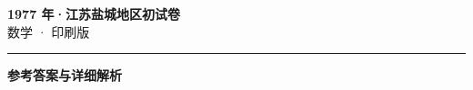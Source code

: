\documentclass[zihao=5, a4paper]{ctexart}
\begin{document}
\begin{center}
  {\Large\bfseries 1977 年·江苏盐城地区初试卷}\\[4pt]
  {\large 数学 · 印刷版}
\end{center}
\medskip
{}

\par\bigskip\hrule\bigskip
{}
\begin{center}{\large\bfseries 参考答案与详细解析}\end{center}
\smallskip

\end{document}
